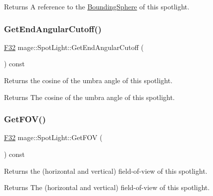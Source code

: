 \begin{DoxyReturn}{Returns}
A reference to the \hyperlink{classmage_1_1_bounding_sphere}{Bounding\+Sphere} of this spotlight. 
\end{DoxyReturn}
\hypertarget{classmage_1_1_spot_light_ad9c4cabf950619605a8040e41b9acb5b}{}\label{classmage_1_1_spot_light_ad9c4cabf950619605a8040e41b9acb5b} 
\subsubsection{\texorpdfstring{Get\+End\+Angular\+Cutoff()}{GetEndAngularCutoff()}}
{\footnotesize\ttfamily \hyperlink{namespacemage_aa97e833b45f06d60a0a9c4fc22ae02c0}{F32} mage\+::\+Spot\+Light\+::\+Get\+End\+Angular\+Cutoff (\begin{DoxyParamCaption}{ }\end{DoxyParamCaption}) const\hspace{0.3cm}{\ttfamily [noexcept]}}

Returns the cosine of the umbra angle of this spotlight.

\begin{DoxyReturn}{Returns}
The cosine of the umbra angle of this spotlight. 
\end{DoxyReturn}
\hypertarget{classmage_1_1_spot_light_a6cbc0ac77c28796cc25a7131bfe4a1c1}{}\label{classmage_1_1_spot_light_a6cbc0ac77c28796cc25a7131bfe4a1c1} 
\subsubsection{\texorpdfstring{Get\+F\+O\+V()}{GetFOV()}}
{\footnotesize\ttfamily \hyperlink{namespacemage_aa97e833b45f06d60a0a9c4fc22ae02c0}{F32} mage\+::\+Spot\+Light\+::\+Get\+F\+OV (\begin{DoxyParamCaption}{ }\end{DoxyParamCaption}) const\hspace{0.3cm}{\ttfamily [noexcept]}}

Returns the (horizontal and vertical) field-\/of-\/view of this spotlight.

\begin{DoxyReturn}{Returns}
The (horizontal and vertical) field-\/of-\/view of this spotlight. 
\end{DoxyReturn}
\hypertarget{classmage_1_1_spot_light_a3df0792c637a6167c7c596ce125abbe0}{}\label{classmage_1_1_spot_light_a3df0792c637a6167c7c596ce125abbe0} 
